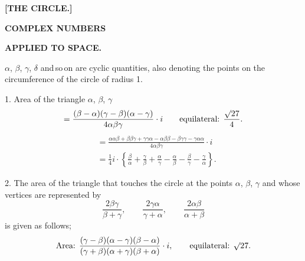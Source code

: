 \clearpage{}
\begin{center}
\textbf{[THE CIRCLE.]}\par\medskip
[I.]\par\medskip
\textbf{COMPLEX NUMBERS}\par
\textbf{APPLIED TO SPACE.}
\end{center}

$\alpha$, $\beta$, $\gamma$, $\delta$ and\,so\,on are cyclic quantities, also denoting the points on the circumference of the circle of radius 1.

1. Area of the triangle $\alpha$, $\beta$, $\gamma$
\[
=\frac{(\beta-\alpha)(\gamma-\beta)(\alpha-\gamma)}{4\alpha\beta\gamma}\cdot i
\qquad \text{equilateral: }\frac{\mathord{\surd}27}{4}.
\]
\[
\begin{aligned}
&=\frac{\alpha\alpha\beta+\beta\beta\gamma+\gamma\gamma\alpha-\alpha\beta\beta-\beta\gamma\gamma-\gamma\alpha\alpha}{4\alpha\beta\gamma}\cdot i\\
&=\tfrac{1}{4}i\cdot\left\{\frac{\beta}{\alpha}+\frac{\gamma}{\beta}+\frac{\alpha}{\gamma}-\frac{\alpha}{\beta}-\frac{\beta}{\gamma}-\frac{\gamma}{\alpha}\right\}.
\end{aligned}
\]

2. The area of the triangle that touches the circle at the points $\alpha$, $\beta$, $\gamma$ and whose vertices are represented by
\[
\frac{2\beta\gamma}{\beta+\gamma},\qquad \frac{2\gamma\alpha}{\gamma+\alpha},\qquad \frac{2\alpha\beta}{\alpha+\beta}
\]
is given as follows;
\[
\text{Area: }\frac{(\gamma-\beta)(\alpha-\gamma)(\beta-\alpha)}{(\gamma+\beta)(\alpha+\gamma)(\beta+\alpha)}\cdot i,
\qquad\text{equilateral: }\mathord{\surd}27.
\]
